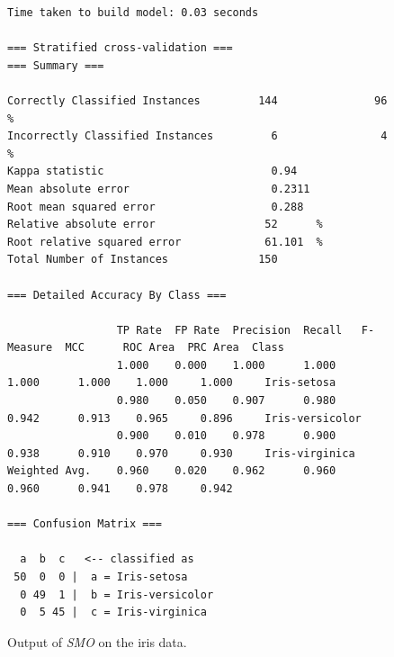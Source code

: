 \begin{figure}[!p]
\begin{mdframed}[innermargin=-1.0cm]
\begin{Verbatim}[fontsize=\tiny]
Time taken to build model: 0.03 seconds

=== Stratified cross-validation ===
=== Summary ===

Correctly Classified Instances         144               96      %
Incorrectly Classified Instances         6                4      %
Kappa statistic                          0.94  
Mean absolute error                      0.2311
Root mean squared error                  0.288 
Relative absolute error                 52      %
Root relative squared error             61.101  %
Total Number of Instances              150     

=== Detailed Accuracy By Class ===

                 TP Rate  FP Rate  Precision  Recall   F-Measure  MCC      ROC Area  PRC Area  Class
                 1.000    0.000    1.000      1.000    1.000      1.000    1.000     1.000     Iris-setosa
                 0.980    0.050    0.907      0.980    0.942      0.913    0.965     0.896     Iris-versicolor
                 0.900    0.010    0.978      0.900    0.938      0.910    0.970     0.930     Iris-virginica
Weighted Avg.    0.960    0.020    0.962      0.960    0.960      0.941    0.978     0.942     

=== Confusion Matrix ===

  a  b  c   <-- classified as
 50  0  0 |  a = Iris-setosa
  0 49  1 |  b = Iris-versicolor
  0  5 45 |  c = Iris-virginica
\end{Verbatim}
\end{mdframed}
\caption{\label{fig:smo_output}Output of \textit{SMO} on the iris data.}
\end{figure}

